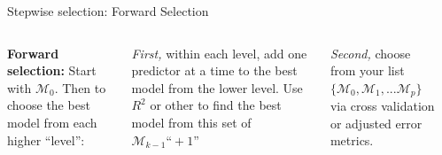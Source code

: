 \documentclass[mathserif, aspectratio=169]{beamer}
\begin{document}
%
%
%

\begin{frame}{Stepwise selection: Forward Selection}

\begin{columns}

\textbf{Forward selection:} Start with $\mathcal{M}_0$.  Then to choose the best model from each higher ``level'':

\vspace{5mm}
\textit{First, }within each level, add one predictor at a time to the best model from the lower level.  Use $R^2$ or other to find the best model from this set of $\mathcal{M}_{k-1} \text{``}+ 1\text{''}$

\vspace{5mm}

\textit{Second,} choose from your list $\{\mathcal{M}_0, \mathcal{M}_1,...\mathcal{M}_{p}\}$ via cross validation or adjusted error metrics.\\~\\


\vspace*{-15mm}
\begin{center}
\end{center}
\end{columns}


\end{frame}
\end{document}
